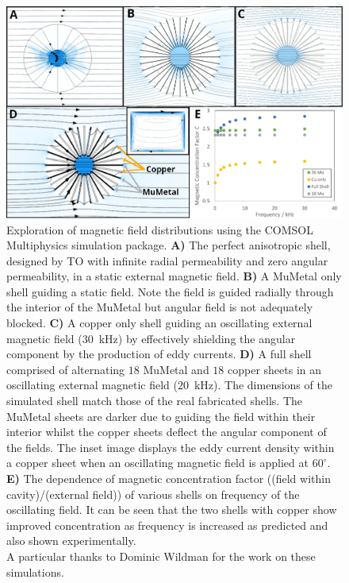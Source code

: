 \documentclass[11pt]{iopart}
\begin{document}
\begin{figure}
  \begin{center}
   \noindent\includegraphics[width=0.89\linewidth]{images/compoundCOMSOL.png}
  \end{center}
  \caption{
    Exploration of magnetic field distributions using the COMSOL
    Multiphysics simulation package.
    \textbf{A)} The perfect anisotropic shell, designed by TO with
    infinite radial permeability and zero angular permeability, in a
    static external magnetic field.
    \textbf{B)} A MuMetal only shell guiding a static field. Note the
    field is guided radially through the interior of the MuMetal but
    angular field is not adequately blocked.
    \textbf{C)} A copper only shell guiding an oscillating external
    magnetic field ($30$~kHz) by effectively shielding the angular component by
    the production of eddy currents.
    \textbf{D)} A full shell comprised of alternating $18$ MuMetal and
    $18$ copper sheets in an oscillating external magnetic field
    ($20$~kHz). The dimensions of the simulated shell match those of
    the real fabricated shells. The MuMetal sheets are darker due to
    guiding the field within their interior whilst the copper sheets
    deflect the angular component of the fields.  The inset image
    displays the eddy current density within a copper sheet when an
    oscillating magnetic field is applied at $60^\circ$.
    \textbf{E)} The dependence of magnetic concentration factor
    ((field within cavity)/(external field)) of various shells on
    frequency of the oscillating field. It can be seen that the two
    shells with copper show improved concentration as frequency is
    increased as predicted and also shown experimentally.\\
    A particular thanks to Dominic Wildman for the work on these
    simulations.
  }
  \label{fig:COMSOL}
  \vspace{-0.7em}
\end{figure}
\end{document}
